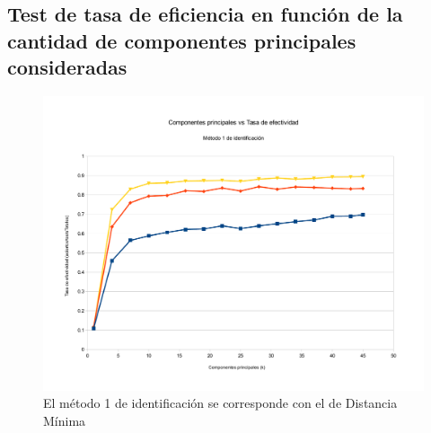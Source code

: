 \subsection{Test de tasa de eficiencia en función de la cantidad de componentes principales consideradas}
\begin{figure}[H]{}
\centering
\includegraphics[scale=0.5]{graphs/componentesPrincipalesVsTasaDeEfectividadM1.pdf}
\caption{El método 1 de identificación se corresponde con el de Distancia Mínima}
\label{CPvsTE}
\end{figure}